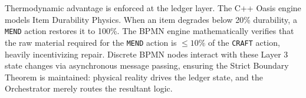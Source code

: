 Thermodynamic advantage is enforced at the ledger layer. The C++ Oasis engine models Item Durability Physics. When an item degrades below 20\% durability, a \texttt{MEND} action restores it to 100\%. The BPMN engine mathematically verifies that the raw material required for the \texttt{MEND} action is $\le 10\%$ of the \texttt{CRAFT} action, heavily incentivizing repair. Discrete BPMN nodes interact with these Layer 3 state changes via asynchronous message passing, ensuring the Strict Boundary Theorem is maintained: physical reality drives the ledger state, and the Orchestrator merely routes the resultant logic.

